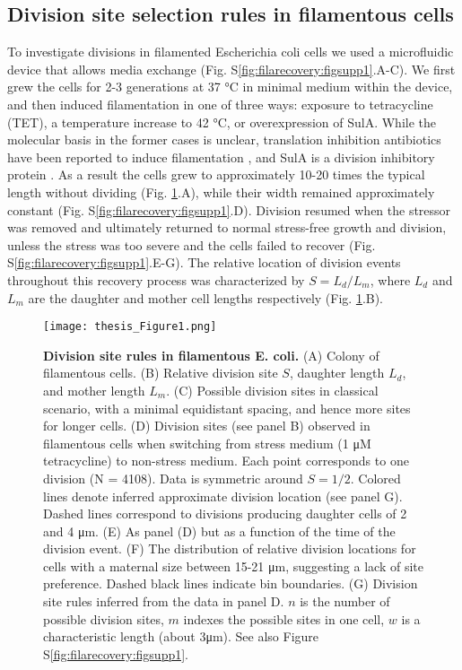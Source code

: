 \subsection{Division site selection rules in filamentous cells}
To investigate divisions in filamented Escherichia coli cells we used a microfluidic device that allows media exchange \cite{Boulineau2013} (Fig. S\ref{fig:filarecovery:figsupp1}.A-C). We first grew the cells for 2-3 generations at 37 °C in minimal medium within the device, and then induced filamentation in one of three ways: exposure to tetracycline (TET), a temperature increase to 42 °C, or overexpression of SulA. While the molecular basis in the former cases is unclear, translation inhibition antibiotics have been reported to induce filamentation \cite{Pulvertaft1952}, and SulA is a division inhibitory protein \cite{Dajkovic2008}. As a result the cells grew to approximately 10-20 times the typical length without dividing (Fig. \ref{fig:filarecovery:fig1}.A), while their width remained approximately constant (Fig. S\ref{fig:filarecovery:figsupp1}.D). Division resumed when the stressor was removed and ultimately returned to normal stress-free growth and division, unless the stress was too severe and the cells failed to recover (Fig. S\ref{fig:filarecovery:figsupp1}.E-G). The relative location of division events throughout this recovery process was characterized by $S = L_d/L_m$, where $L_d$ and $L_m$ are the daughter and mother cell lengths respectively (Fig. \ref{fig:filarecovery:fig1}.B). 

\begin{figure}
    \centering
    \texttt{[image: thesis\_Figure1.png]}
    \caption{ 
        \textbf{Division site rules in filamentous E. coli.} 
        (A) Colony of filamentous cells. (B) Relative division site $S$, daughter length $L_d$, and mother length $L_m$. (C) Possible division sites in classical scenario, with a minimal equidistant spacing, and hence more sites for longer cells. (D) Division sites (see panel B) observed in filamentous cells when switching from stress medium (1 μM tetracycline) to non-stress medium. Each point corresponds to one division (N = 4108). Data is symmetric around $S = 1/2$. Colored lines denote inferred approximate division location (see panel G). Dashed lines correspond to divisions producing daughter cells of 2 and 4 μm. (E) As panel (D) but as a function of the time of the division event. (F) The distribution of relative division locations for cells with a maternal size between 15-21 μm, suggesting a lack of site preference. Dashed black lines indicate bin boundaries. (G) Division site rules inferred from the data in panel D. $n$ is the number of possible division sites, $m$ indexes the possible sites in one cell, $w$ is a characteristic length (about 3μm). See also Figure S\ref{fig:filarecovery:figsupp1}.        
    }
    \label{fig:filarecovery:fig1} %
\end{figure}


